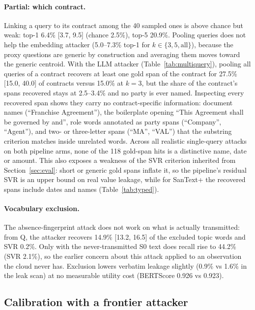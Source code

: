 \paragraph{Partial: which contract.} Linking a query to its contract among the 40 sampled ones is above chance but weak: top-1 6.4\% [3.7, 9.5] (chance 2.5\%), top-5 20.9\%. Pooling queries does not help the embedding attacker (5.0--7.3\% top-1 for $k\in\{3,5,\text{all}\}$), because the proxy questions are generic by construction and averaging them moves toward the generic centroid. With the LLM attacker (Table~\ref{tab:multiquery}), pooling all queries of a contract recovers at least one gold span of the contract for 27.5\% [15.0, 40.0] of contracts versus 15.0\% at $k{=}3$, but the share of the contract's spans recovered stays at 2.5--3.4\% and no party is ever named. Inspecting every recovered span shows they carry no contract-specific information: document names (``Franchise Agreement''), the boilerplate opening ``This Agreement shall be governed by and'', role words annotated as party spans (``Company'', ``Agent''), and two- or three-letter spans (``MA'', ``VAL'') that the substring criterion matches inside unrelated words. Across all realistic single-query attacks on both pipeline arms, none of the 118 gold-span hits is a distinctive name, date or amount. This also exposes a weakness of the SVR criterion inherited from Section~\ref{sec:eval}: short or generic gold spans inflate it, so the pipeline's residual SVR is an upper bound on real value leakage, while for SanText+ the recovered spans include dates and names (Table~\ref{tab:typed}).

\paragraph{Vocabulary exclusion.} The absence-fingerprint attack does not work on what is actually transmitted: from Q, the attacker recovers 14.9\% [13.2, 16.5] of the excluded topic words and SVR 0.2\%. Only with the never-transmitted S0 text does recall rise to 44.2\% (SVR 2.1\%), so the earlier concern about this attack applied to an observation the cloud never has. Exclusion lowers verbatim leakage slightly (0.9\% vs 1.6\% in the leak scan) at no measurable utility cost (BERTScore 0.926 vs 0.923).

\subsection{Calibration with a frontier attacker}
\label{sec:adaptive:fable}

